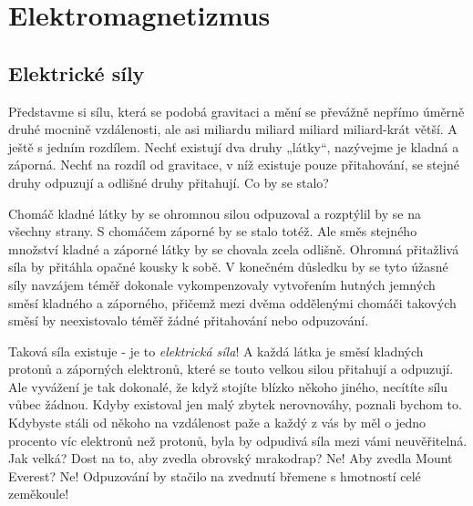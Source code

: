 \graphicspath{{../src/FYZ/img/}}
\setchaptertoc
\chapter{Elektromagnetizmus}\label{fyz:IIchapI}
  \section{Elektrické síly}
    \cite[s.~13]{Feynman02} Představme si sílu, která se podobá gravitaci a mění se převážně nepřímo
    úměrně druhé mocnině vzdálenosti, ale asi miliardu miliard miliard miliard-krát větší. A ještě 
    s jedním rozdílem. Nechť existují dva druhy „látky“, nazývejme je kladná a záporná. Nechť na 
    rozdíl od gravitace, v níž existuje pouze přitahování, se stejné druhy odpuzují a odlišné druhy 
    přitahují. Co by se stalo?
    
    Chomáč kladné látky by se ohromnou silou odpuzoval a rozptýlil by se na všechny strany. S
    chomáčem záporné by se stalo totéž. Ale směs stejného množství kladné a záporné látky by se
    chovala zcela odlišně. Ohromná přitažlivá síla by přitáhla opačné kousky k sobě. V konečném
    důsledku by se tyto úžasné síly navzájem téměř dokonale vykompenzovaly vytvořením hutných
    jemných směsí kladného a záporného, přičemž mezi dvěma oddělenými chomáči takových směsí by
    neexistovalo téměř žádné přitahování nebo odpuzování.
    
    Taková síla existuje - je to \emph{elektrická síla}! A každá látka je směsí kladných protonů a 
    záporných elektronů, které se touto velkou silou přitahují a odpuzují. Ale vyvážení je tak 
    dokonalé, že když stojíte blízko někoho jiného, necítíte sílu vůbec žádnou. Kdyby existoval jen 
    malý zbytek nerovnováhy, poznali bychom to. Kdybyste stáli od někoho na vzdálenost paže a každý 
    z vás by měl o jedno procento víc elektronů než protonů, byla by odpudivá síla mezi vámi 
    neuvěřitelná. Jak velká? Dost na to, aby zvedla obrovský mrakodrap? Ne! Aby zvedla Mount 
    Everest? Ne! Odpuzování by stačilo na zvednutí břemene s hmotností celé zeměkoule!

